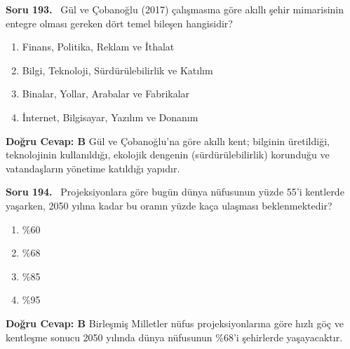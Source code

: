 \documentclass[11pt,a4paper,openany]{book}
\begin{document}
\needspace{5cm}
\vspace{8pt}
\noindent\textbf{\large\sffamily Soru 193.} \ Gül ve Çobanoğlu (2017) çalışmasına göre akıllı şehir mimarisinin entegre olması gereken dört temel bileşen hangisidir?
\begin{enumerate}[label=\Alph*), leftmargin=25pt, topsep=4pt, itemsep=2pt]
    \item Finans, Politika, Reklam ve İthalat
    \item Bilgi, Teknoloji, Sürdürülebilirlik ve Katılım
    \item Binalar, Yollar, Arabalar ve Fabrikalar
    \item İnternet, Bilgisayar, Yazılım ve Donanım
\end{enumerate}
\vspace{4pt}
\begin{tcolorbox}[title=Cevap ve Açıklama, colback=gray!3!white, colframe=primarycolor!90!black, arc=2mm, fonttitle=\bfseries\sffamily, top=6pt, bottom=6pt]
    \textbf{Doğru Cevap: B}
    \vspace{2pt}
    Gül ve Çobanoğlu'na göre akıllı kent; bilginin üretildiği, teknolojinin kullanıldığı, ekolojik dengenin (sürdürülebilirlik) korunduğu ve vatandaşların yönetime katıldığı yapıdır.
\end{tcolorbox}
\vspace{10pt}

\needspace{5cm}
\vspace{8pt}
\noindent\textbf{\large\sffamily Soru 194.} \ Projeksiyonlara göre bugün dünya nüfusunun yüzde 55'i kentlerde yaşarken, 2050 yılına kadar bu oranın yüzde kaça ulaşması beklenmektedir?
\begin{enumerate}[label=\Alph*), leftmargin=25pt, topsep=4pt, itemsep=2pt]
    \item \%60
    \item \%68
    \item \%85
    \item \%95
\end{enumerate}
\vspace{4pt}
\begin{tcolorbox}[title=Cevap ve Açıklama, colback=gray!3!white, colframe=primarycolor!90!black, arc=2mm, fonttitle=\bfseries\sffamily, top=6pt, bottom=6pt]
    \textbf{Doğru Cevap: B}
    \vspace{2pt}
    Birleşmiş Milletler nüfus projeksiyonlarına göre hızlı göç ve kentleşme sonucu 2050 yılında dünya nüfusunun \%68'i şehirlerde yaşayacaktır.
\end{tcolorbox}
\vspace{10pt}
\end{document}
